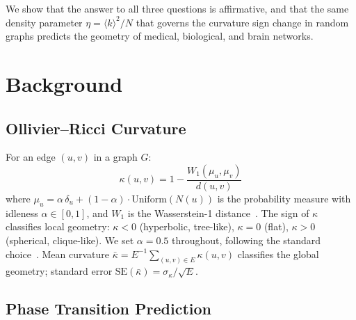 \documentclass[11pt,a4paper]{article}
\newcommand{\kbar}{\bar{\kappa}}
\newcommand{\kavg}{\langle k \rangle}
\begin{document}
We show that the answer to all three questions is affirmative, and that the same density parameter $\eta = \kavg^2/N$ that governs the curvature sign change in random graphs predicts the geometry of medical, biological, and brain networks.

\section{Background}
\label{sec:background}

\subsection{Ollivier--Ricci Curvature}

For an edge $(u,v)$ in a graph $G$:
\begin{equation}
    \kappa(u,v) = 1 - \frac{W_1(\mu_u, \mu_v)}{d(u,v)}
    \label{eq:orc}
\end{equation}
where $\mu_u = \alpha\,\delta_u + (1-\alpha) \cdot \mathrm{Uniform}(N(u))$ is the probability measure with idleness $\alpha \in [0,1]$, and $W_1$ is the Wasserstein-1 distance~\cite{ollivier2009ricci}. The sign of $\kappa$ classifies local geometry: $\kappa < 0$ (hyperbolic, tree-like), $\kappa = 0$ (flat), $\kappa > 0$ (spherical, clique-like). We set $\alpha = 0.5$ throughout, following the standard choice~\cite{ollivier2009ricci,jost2014ollivier}. Mean curvature $\kbar = E^{-1}\sum_{(u,v)\in E} \kappa(u,v)$ classifies the global geometry; standard error $\mathrm{SE}(\kbar) = \sigma_\kappa / \sqrt{E}$.

\subsection{Phase Transition Prediction}
\end{document}
